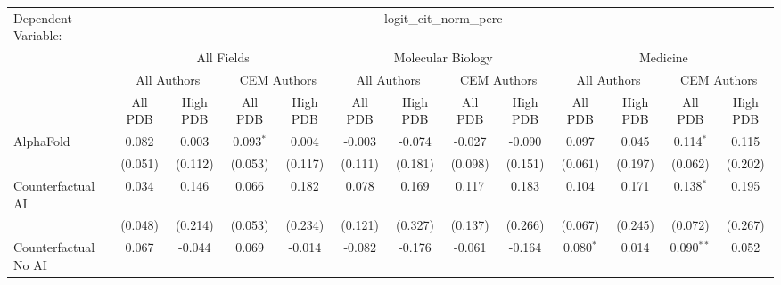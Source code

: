 \begingroup
\centering
\begin{tabular}{lcccccccccccc}
   \tabularnewline \midrule \midrule
   Dependent Variable: & \multicolumn{12}{c}{logit\_cit\_norm\_perc}\\
 & \multicolumn{4}{c}{All Fields} & \multicolumn{4}{c}{Molecular Biology} & \multicolumn{4}{c}{Medicine} \\
\cmidrule(lr){2-5} \cmidrule(lr){6-9} \cmidrule(lr){10-13}
 & \multicolumn{2}{c}{All Authors} & \multicolumn{2}{c}{CEM Authors} & \multicolumn{2}{c}{All Authors} & \multicolumn{2}{c}{CEM Authors} & \multicolumn{2}{c}{All Authors} & \multicolumn{2}{c}{CEM Authors} \\
\cmidrule(lr){2-3} \cmidrule(lr){4-5} \cmidrule(lr){6-7} \cmidrule(lr){8-9} \cmidrule(lr){10-11} \cmidrule(lr){12-13}
 & \multicolumn{1}{c}{All PDB} & \multicolumn{1}{c}{High PDB} & \multicolumn{1}{c}{All PDB} & \multicolumn{1}{c}{High PDB} & \multicolumn{1}{c}{All PDB} & \multicolumn{1}{c}{High PDB} & \multicolumn{1}{c}{All PDB} & \multicolumn{1}{c}{High PDB} & \multicolumn{1}{c}{All PDB} & \multicolumn{1}{c}{High PDB} & \multicolumn{1}{c}{All PDB} & \multicolumn{1}{c}{High PDB} \\
\cmidrule(lr){2-2} \cmidrule(lr){3-3} \cmidrule(lr){4-4} \cmidrule(lr){5-5} \cmidrule(lr){6-6} \cmidrule(lr){7-7} \cmidrule(lr){8-8} \cmidrule(lr){9-9} \cmidrule(lr){10-10} \cmidrule(lr){11-11} \cmidrule(lr){12-12} \cmidrule(lr){13-13}
   AlphaFold                                                  & 0.082   & 0.003         & 0.093$^{*}$  & 0.004        & -0.003  & -0.074  & -0.027       & -0.090        & 0.097         & 0.045         & 0.114$^{*}$   & 0.115\\   
                                                              & (0.051) & (0.112)       & (0.053)      & (0.117)      & (0.111) & (0.181) & (0.098)      & (0.151)       & (0.061)       & (0.197)       & (0.062)       & (0.202)\\   
   Counterfactual AI                                          & 0.034   & 0.146         & 0.066        & 0.182        & 0.078   & 0.169   & 0.117        & 0.183         & 0.104         & 0.171         & 0.138$^{*}$   & 0.195\\   
                                                              & (0.048) & (0.214)       & (0.053)      & (0.234)      & (0.121) & (0.327) & (0.137)      & (0.266)       & (0.067)       & (0.245)       & (0.072)       & (0.267)\\   
   Counterfactual No AI                                       & 0.067   & -0.044        & 0.069        & -0.014       & -0.082  & -0.176  & -0.061       & -0.164        & 0.080$^{*}$   & 0.014         & 0.090$^{**}$  & 0.052\\   

\end{tabular}

